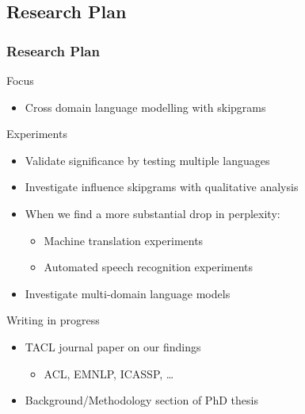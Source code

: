 \documentclass{beamer}
\begin{document}
\begin{frame}\section{Research Plan}
    \frametitle{Research Plan}

    \begin{block}{Focus}
        \begin{itemize}
            \item Cross domain language modelling with skipgrams
        \end{itemize}
    \end{block}

    \begin{block}{Experiments}
        \begin{itemize}
            \item Validate significance by testing multiple languages
            \item Investigate influence skipgrams with qualitative analysis
            \item When we find a more substantial drop in perplexity:
                \begin{itemize}
                    \item Machine translation experiments
                    \item Automated speech recognition experiments
                \end{itemize}
            \item Investigate multi-domain language models
        \end{itemize}
    \end{block}

    \begin{block}{Writing in progress}
        \begin{itemize}
            \item TACL journal paper on our findings
                \begin{itemize}
                    \item ACL, EMNLP, ICASSP, \ldots
                \end{itemize}
            \item Background/Methodology section of PhD thesis
        \end{itemize}
    \end{block}
\end{frame}
\end{document}
